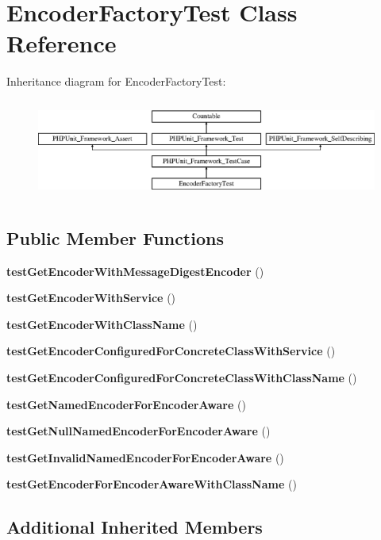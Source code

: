 \section{Encoder\+Factory\+Test Class Reference}
\label{class_symfony_1_1_component_1_1_security_1_1_core_1_1_tests_1_1_encoder_1_1_encoder_factory_test}
Inheritance diagram for Encoder\+Factory\+Test\+:\begin{figure}[H]
\begin{center}
\leavevmode
\includegraphics[height=3.303835cm]{class_symfony_1_1_component_1_1_security_1_1_core_1_1_tests_1_1_encoder_1_1_encoder_factory_test}
\end{center}
\end{figure}
\subsection*{Public Member Functions}
\begin{DoxyCompactItemize}
\item 
{\bf test\+Get\+Encoder\+With\+Message\+Digest\+Encoder} ()
\item 
{\bf test\+Get\+Encoder\+With\+Service} ()
\item 
{\bf test\+Get\+Encoder\+With\+Class\+Name} ()
\item 
{\bf test\+Get\+Encoder\+Configured\+For\+Concrete\+Class\+With\+Service} ()
\item 
{\bf test\+Get\+Encoder\+Configured\+For\+Concrete\+Class\+With\+Class\+Name} ()
\item 
{\bf test\+Get\+Named\+Encoder\+For\+Encoder\+Aware} ()
\item 
{\bf test\+Get\+Null\+Named\+Encoder\+For\+Encoder\+Aware} ()
\item 
{\bf test\+Get\+Invalid\+Named\+Encoder\+For\+Encoder\+Aware} ()
\item 
{\bf test\+Get\+Encoder\+For\+Encoder\+Aware\+With\+Class\+Name} ()
\end{DoxyCompactItemize}
\subsection*{Additional Inherited Members}


